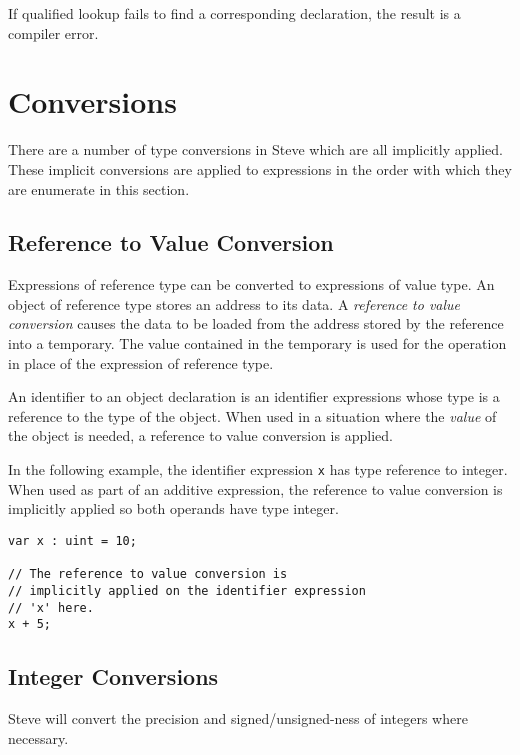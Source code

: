 If qualified lookup fails to find a corresponding declaration, the result is a compiler error.

\section{Conversions} \label{conversions_guide}

There are a number of type conversions in Steve which are all implicitly applied. These implicit conversions are applied to expressions in the order with which they are enumerate in this section.

\subsection{Reference to Value Conversion} \label{reftoval_conv}

Expressions of reference type can be converted to expressions of value type. An object of reference type stores an address to its data. A \textit{reference to value conversion} causes the data to be loaded from the address stored by the reference into a temporary. The value contained in the temporary is used for the operation in place of the expression of reference type.

An identifier to an object declaration is an identifier expressions whose type is a reference to the type of the object. When used in a situation where the \textit{value} of the object is needed, a reference to value conversion is applied. 

In the following example, the identifier expression \texttt{x} has type reference to integer. When used as part of an additive expression, the reference to value conversion is implicitly applied so both operands have type integer.

\noindent\begin{minipage}{\linewidth}
\begin{lstlisting}
var x : uint = 10;

// The reference to value conversion is
// implicitly applied on the identifier expression
// 'x' here.
x + 5;
\end{lstlisting}
\end{minipage}

\subsection{Integer Conversions} \label{int_conv}

Steve will convert the precision and signed/unsigned-ness of integers where necessary.

